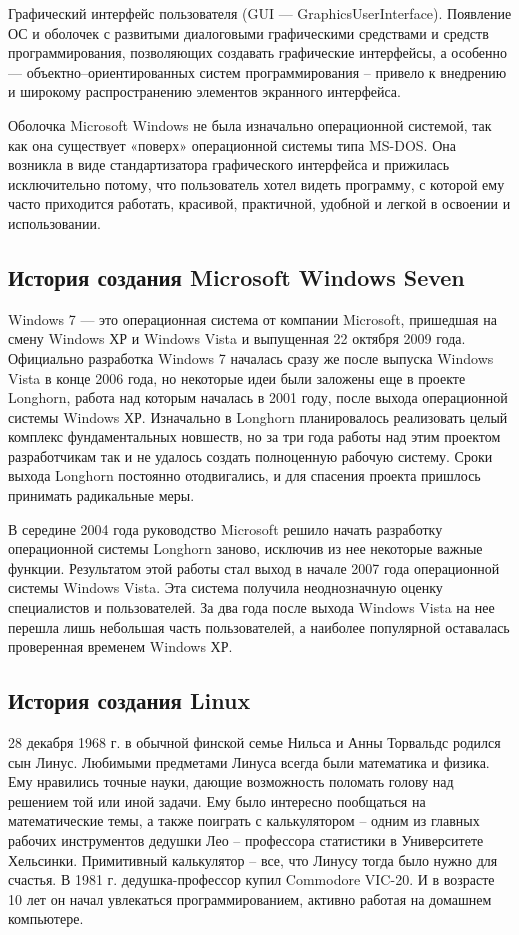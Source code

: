 \documentclass[14pt]{article}
\begin{document}
    Графический интерфейс пользователя (GUI --- GraphicsUserInterface).
    Появление ОС и оболочек с развитыми диалоговыми графическими средствами и средств программирования, позволяющих создавать графические интерфейсы, а особенно --- объектно–ориентированных систем программирования – привело к внедрению и широкому распространению элементов экранного интерфейса.

    Оболочка Microsoft Windows не была изначально операционной системой, так как она существует «поверх» операционной системы типа MS-DOS. Она возникла в виде стандартизатора графического интерфейса и прижилась исключительно потому, что пользователь хотел видеть программу, с которой ему часто приходится работать, красивой, практичной, удобной и легкой в освоении и использовании.

    \newpage
    \subsection{История создания Microsoft Windows Seven}
    Windows 7 --- это операционная система от компании Microsoft, пришедшая на смену Windows ХР и Windows Vista и выпущенная 22 октября 2009 года.
    Официально разработка Windows 7 началась сразу же после выпуска Windows Vista в конце 2006 года, но некоторые идеи были заложены еще в проекте Longhorn, работа над которым началась в 2001 году, после выхода операционной системы Windows ХР.
    Изначально в Longhorn планировалось реализовать целый комплекс фундаментальных новшеств, но за три года работы над этим проектом разработчикам так и не удалось создать полноценную рабочую систему.
    Сроки выхода Longhorn постоянно отодвигались, и для спасения проекта пришлось принимать радикальные меры.

    В середине 2004 года руководство Microsoft решило начать разработку операционной системы Longhorn заново, исключив из нее некоторые важные функции.
    Результатом этой работы стал выход в начале 2007 года операционной системы Windows Vista.
    Эта система получила неоднозначную оценку специалистов и пользователей.
    За два года после выхода Windows Vista на нее перешла лишь небольшая часть пользователей, а наиболее популярной оставалась проверенная временем Windows ХР.

    \subsection{История создания Linux}
    28 декабря 1968 г. в обычной финской семье Нильса и Анны Торвальдс родился сын Линус.
    Любимыми предметами Линуса всегда были математика и физика.
    Ему нравились точные науки, дающие возможность поломать голову над решением той или иной задачи.
    Ему было интересно пообщаться на математические темы, а также поиграть с калькулятором – одним из главных рабочих инструментов дедушки Лео – профессора статистики в Университете Хельсинки.
    Примитивный калькулятор – все, что Линусу тогда было нужно для счастья. В 1981 г. дедушка-профессор купил Commodore VIC-20.
    И в возрасте 10 лет он начал увлекаться программированием, активно работая на домашнем компьютере.
\end{document}
